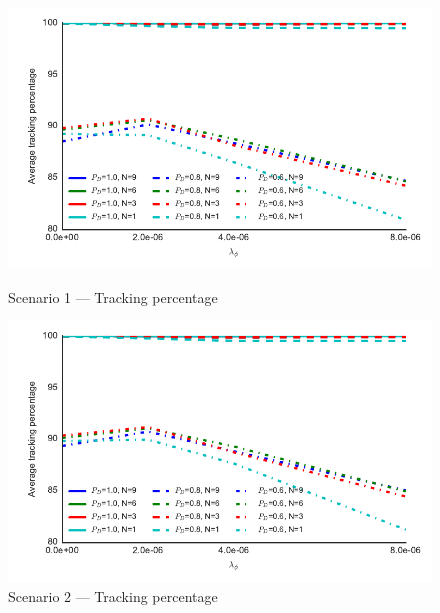 \begin{figure}
\centering
\includegraphics{Figures/plots/Scenario1_Tracking-TrackingPercentage.pdf}
\caption{Scenario 1 --- Tracking percentage}\label{fig:scenario1_tracking_percentage}

\includegraphics{Figures/plots/Scenario2_Tracking-TrackingPercentage.pdf}
\caption{Scenario 2 --- Tracking percentage}\label{fig:scenario2_tracking_percentage}
\end{figure}

